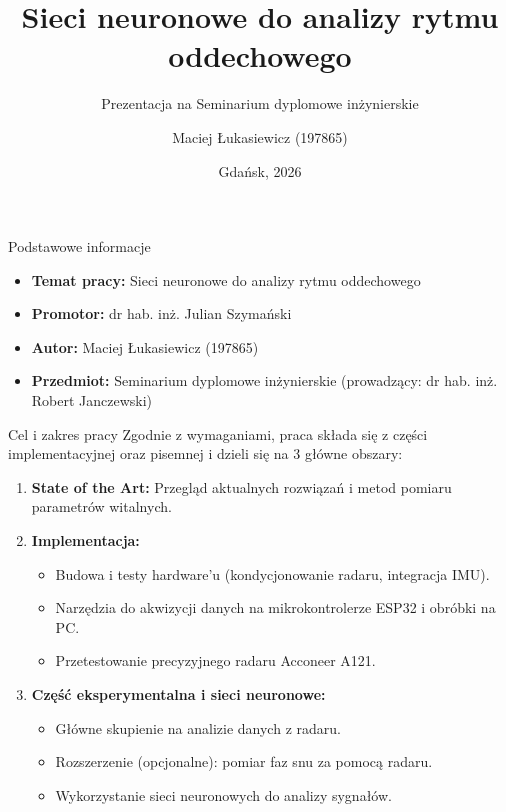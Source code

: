 \documentclass{beamer}
\title[Sieci neuronowe - rytm oddechowy]{Sieci neuronowe do analizy rytmu oddechowego}
\subtitle{Prezentacja na Seminarium dyplomowe inżynierskie}
\author[M. Łukasiewicz]{Maciej Łukasiewicz (197865)}
\institute[]{Politechnika Gdańska}
\date{Gdańsk, 2026}
\begin{document}
\begin{frame}
    \titlepage
\end{frame}

\begin{frame}{Podstawowe informacje}
    \begin{itemize}
        \item \textbf{Temat pracy:} Sieci neuronowe do analizy rytmu oddechowego
        \item \textbf{Promotor:} dr hab. inż. Julian Szymański
        \item \textbf{Autor:} Maciej Łukasiewicz (197865)
        \item \textbf{Przedmiot:} Seminarium dyplomowe inżynierskie (prowadzący: dr hab. inż. Robert Janczewski)
    \end{itemize}
\end{frame}

\begin{frame}{Cel i zakres pracy}
    Zgodnie z wymaganiami, praca składa się z części implementacyjnej oraz pisemnej i dzieli się na 3 główne obszary:
    \begin{enumerate}
        \item \textbf{State of the Art:} Przegląd aktualnych rozwiązań i metod pomiaru parametrów witalnych.
        \item \textbf{Implementacja:} 
        \begin{itemize}
            \item Budowa i testy hardware'u (kondycjonowanie radaru, integracja IMU).
            \item Narzędzia do akwizycji danych na mikrokontrolerze ESP32 i obróbki na PC.
            \item Przetestowanie precyzyjnego radaru Acconeer A121.
        \end{itemize}
        \item \textbf{Część eksperymentalna i sieci neuronowe:} 
        \begin{itemize}
            \item Główne skupienie na analizie danych z radaru.
            \item Rozszerzenie (opcjonalne): pomiar faz snu za pomocą radaru.
            \item Wykorzystanie sieci neuronowych do analizy sygnałów.
        \end{itemize}
    \end{enumerate}
\end{frame}
\end{document}
